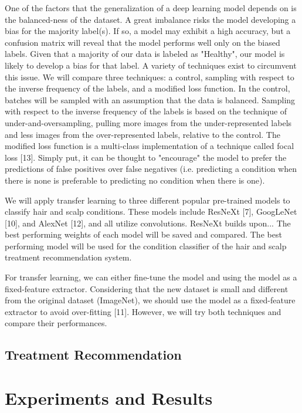 \documentclass[10pt,twocolumn,letterpaper]{article}
\begin{document}
One of the factors that the generalization of a deep learning model depends on is the balanced-ness of the dataset. A great imbalance risks the model developing a bias for the majority label(s). If so, a model may exhibit a high accuracy, but a confusion matrix will reveal that the model performs well only on the biased labels. Given that a majority of our data is labeled as "Healthy", our model is likely to develop a bias for that label. A variety of techniques exist to circumvent this issue. We will compare three techniques: a control, sampling with respect to the inverse frequency of the labels, and a modified loss function. In the control, batches will be sampled with an assumption that the data is balanced. Sampling with respect to the inverse frequency of the labels is based on the technique of under-and-oversampling, pulling more images from the under-represented labels and less images from the over-represented labels, relative to the control. The modified loss function is a multi-class implementation of a technique called focal loss [13]. Simply put, it can be thought to "encourage" the model to prefer the predictions of false positives over false negatives (i.e. predicting a condition when there is none is preferable to predicting no condition when there is one).

We will apply transfer learning to three different popular pre-trained models to classify hair and scalp conditions. These models include ResNeXt [7], GoogLeNet [10], and AlexNet [12], and all utilize convolutions. ResNeXt builds upon... The best performing weights of each model will be saved and compared. The best performing model will be used for the condition classifier of the hair and scalp treatment recommendation system.

For transfer learning, we can either fine-tune the model and using the model as a fixed-feature extractor. Considering that the new dataset is small and different from the original dataset (ImageNet), we should use the model as a fixed-feature extractor to avoid over-fitting [11]. However, we will try both techniques and compare their performances.

\subsection{Treatment Recommendation}

\section{Experiments and Results}
\end{document}
